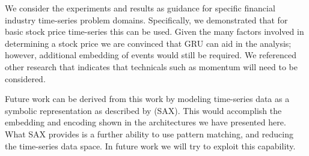 \documentclass[11pt]{article}
\begin{document}
We consider the experiments and results as guidance for specific financial industry time-series problem domains. Specifically, we demonstrated that for basic stock price time-series this can be used. Given the many factors involved in determining a stock price we are convinced that GRU can aid in the analysis; however, additional embedding of events would still be required. We referenced other research that indicates that technicals such as momentum will need to be considered.

Future work can be derived from this work by modeling time-series data as a symbolic representation as described by \citet{Lin2003AAlgorithms} (SAX). This would accomplish the embedding and encoding shown in the architectures we have presented here. What SAX provides is a further ability to use pattern matching, and reducing the time-series data space. In future work we will try to exploit this capability.


%

\end{document}

